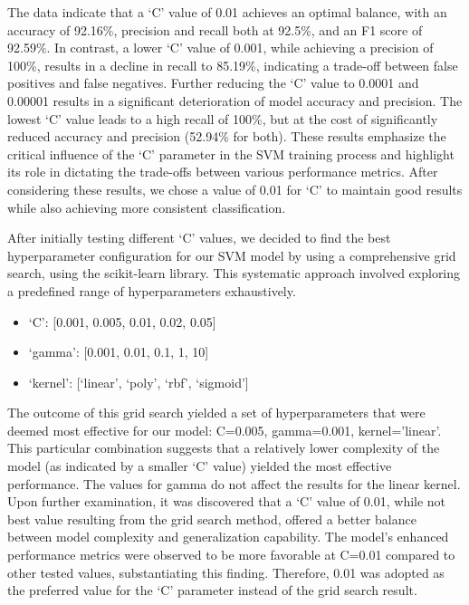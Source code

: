 \documentclass[english,bachelor]{swsLeipzig}
\begin{document}
The data indicate that a `C' value of 0.01 achieves an optimal balance, with an accuracy of 92.16\%, 
precision and recall both at 92.5\%, and an F1 score of 92.59\%. In contrast, a lower `C' value of 0.001, while achieving a precision of 100\%, results in a decline in recall to 85.19\%, indicating a trade-off between false positives and false negatives. Further reducing the `C' value to 0.0001 and 0.00001 results in a significant deterioration of model accuracy and precision. The lowest `C' value leads to a high recall of 100\%, but at the cost of significantly reduced accuracy and precision (52.94\% for both). These results emphasize the critical influence of the `C' parameter in the SVM training process and highlight its role in dictating the trade-offs between various performance metrics. After considering these results, we chose a value of 0.01 for `C' to maintain good results while also achieving more consistent classification.

After initially testing different `C' values, we decided to find the best hyperparameter configuration for our SVM model by using a comprehensive grid 
search, using the scikit-learn library. This systematic approach involved exploring a predefined range of hyperparameters exhaustively.

\newpage
  
\begin{itemize}
  \item `C': [0.001, 0.005, 0.01, 0.02, 0.05]
  \item `gamma': [0.001, 0.01, 0.1, 1, 10]
  \item `kernel': [`linear', `poly', `rbf', `sigmoid']
\end{itemize}

The outcome of this grid search yielded a set of hyperparameters that were deemed most effective for our 
model: C=0.005, gamma=0.001, kernel='linear'. This particular combination suggests that a relatively lower complexity of the model (as indicated by a smaller `C' value) yielded the most effective performance. The values for gamma do not affect the results for the linear kernel. Upon further examination, it was discovered that a `C' value of 0.01, while not best value resulting from the grid search method, offered a better balance between model complexity and generalization capability. The model's enhanced performance metrics were observed to be more favorable at C=0.01 compared to other tested values, substantiating this finding. Therefore, 0.01 was adopted as the preferred value for the `C' parameter instead of the grid search result.
\end{document}
